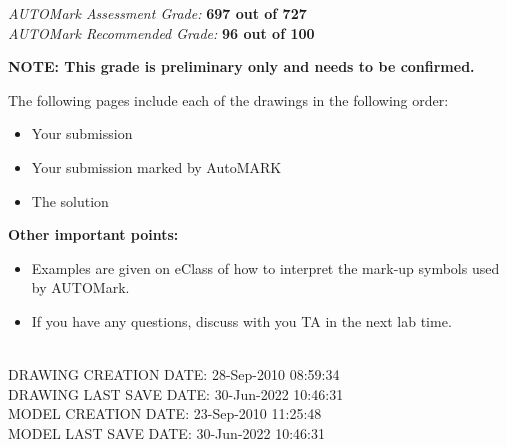 \documentclass{article}
\begin{document}
\begin{center}
 \large \emph {{AUTOMark Assessment Grade:}}
 \large \textbf{697 out of 727}\\[0.5 cm] %
 \large \emph {{AUTOMark Recommended Grade:}}
 \large \textbf{96 out of 100}\\[0.5 cm] %
\end{center}
\vspace{1.0\baselineskip} %
\begin{flushleft}
\textbf{NOTE: This grade is preliminary only and needs to be confirmed.}\\[1.0 cm] %
\end{flushleft}
The following pages include each of the drawings in the following order:
\begin{itemize}
\itemsep0em %
	\item Your submission 
	\item Your submission marked by AutoMARK
	\item The solution
\end{itemize}
%
\textbf{Other important points:}
\begin{itemize}
\itemsep0em %
	\item Examples are given on eClass of how to interpret the mark-up symbols used by AUTOMark.
	\item If you have any questions, discuss with you TA in the next lab time.
\end{itemize}

\begin{flushleft} \large
\\[0.5cm]
DRAWING CREATION DATE: {28-Sep-2010 08:59:34}\\
DRAWING LAST SAVE DATE: {30-Jun-2022 10:46:31}\\
MODEL CREATION DATE: {23-Sep-2010 11:25:48}\\
MODEL LAST SAVE DATE: {30-Jun-2022 10:46:31}\\
\end{flushleft}
\end{document}
